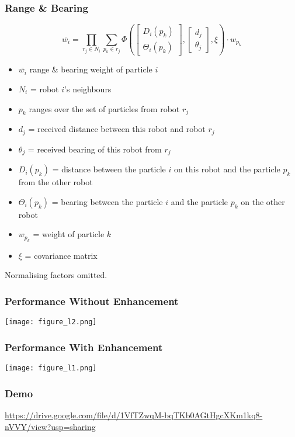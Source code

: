 \documentclass{beamer}
\begin{document}
	\begin{frame}
		\frametitle{Range \& Bearing}
		\[
		\bar{w_i} = \prod_{r_j \in N_i}\sum_{p_k \in r_j}\Phi\left(
		\begin{bmatrix}
		D_i(p_k)\\
		\Theta_i(p_k)
		\end{bmatrix},
		\begin{bmatrix}
		d_j\\
		\theta_j
		\end{bmatrix},
		\xi
		\right) \cdot w_{p_k}
		\]
		\begin{itemize}
			\item $\bar{w_i}$ range \& bearing weight of particle $i$
			\item $N_i$ = robot $i$'s neighbours
			\item $p_k$ ranges over the set of particles from robot $r_j$ \item $d_j$ = received distance between this robot and robot $r_j$
			\item $\theta_j$ = received bearing of this robot from $r_j$
			\item $D_i(p_k)$  = distance between the particle $i$ on this robot and the particle $p_k$ from the other robot
			\item $\Theta_i(p_k)$ = bearing between the particle $i$ and the particle $p_k$ on the other robot
			\item $w_{p_k}$ = weight of particle $k$
			\item $\xi$ = covariance matrix
		\end{itemize}
		Normalising factors omitted.
	\end{frame}	
	\begin{frame}
		\frametitle{Performance Without Enhancement}
		\texttt{[image: figure\_l2.png]}
	\end{frame}
	\begin{frame}
		\frametitle{Performance With Enhancement}
		\texttt{[image: figure\_l1.png]}
	\end{frame}
	\begin{frame}
		\frametitle{Demo}
		\url{https://drive.google.com/file/d/1VfTZwqM-bqTKb0AGtHgcXKm1kq8-nVVY/view?usp=sharing}
	\end{frame}
\end{document}
